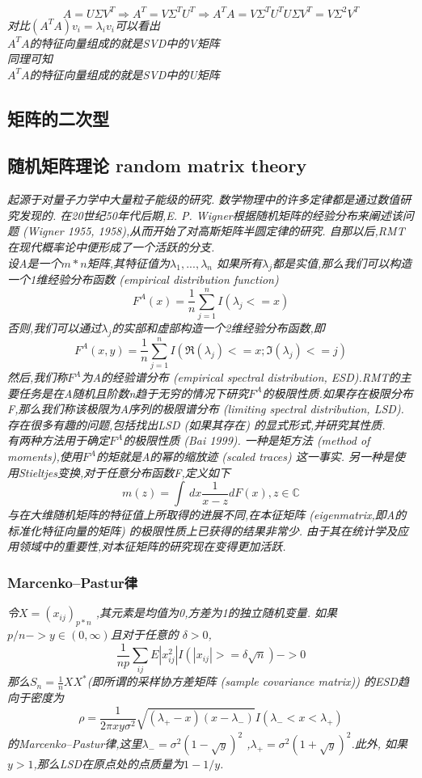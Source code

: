 \documentclass{scrartcl}
\numberwithin{equation}{section}   %
\begin{document}
\begin{equation}
    A = U \Sigma V^T \Rightarrow  A^T = V \Sigma ^T U^T \Rightarrow A^T A =  V \Sigma ^T U^TU \Sigma V^T = V \Sigma^2 V^T
\end{equation}
\textsl{对比$(A^T A )v_i= \lambda_i v_i $可以看出\\$A^T A $的特征向量组成的就是SVD中的V矩阵\\ 同理可知\\
    $A^T A $的特征向量组成的就是SVD中的U矩阵}





\subsection{矩阵的二次型}
\newpage


\subsection{随机矩阵理论 random matrix theory}
\textsl{起源于对量子力学中大量粒子能级的研究. 数学物理中的许多定律都是通过数值研究发现的. 在20世纪50年代后期,E. P. Wigner根据随机矩阵的经验分布来阐述该问题 (Wigner 1955, 1958),从而开始了对高斯矩阵半圆定律的研究. 自那以后,RMT在现代概率论中便形成了一个活跃的分支.\\
    设A是一个$m*n$矩阵,其特征值为$\lambda_1,...,\lambda_n$ 如果所有$\lambda_j$都是实值,那么我们可以构造一个1维经验分布函数 (empirical distribution function) $$F^A(x) =\frac{1}{n}\sum_{j=1}^nI(\lambda_j <= x)$$否则,我们可以通过$\lambda_j$的实部和虚部构造一个2维经验分布函数,即$$F^A(x, y) = \frac{1}{n}\sum_{j=1}^nI(\mathfrak{R} (\lambda_j) <= x; \mathfrak{I} (\lambda_j) <= j) $$然后,我们称$F^A$为A的经验谱分布 (empirical spectral distribution, ESD).RMT的主要任务是在A随机且阶数n趋于无穷的情况下研究$F^A$的极限性质.如果存在极限分布F,那么我们称该极限为A序列的极限谱分布 (limiting spectral distribution, LSD). 存在很多有趣的问题,包括找出LSD (如果其存在) 的显式形式,并研究其性质.\\
    有两种方法用于确定$F^A$的极限性质 (Bai 1999). 一种是矩方法 (method of moments),使用$F^A$的矩就是A的幂的缩放迹 (scaled traces) 这一事实. 另一种是使用Stieltjes变换,对于任意分布函数F,定义如下$$m(z)  = \int \,dx  \frac{1}{x-z} dF(x), z \in \mathbb{C} $$与在大维随机矩阵的特征值上所取得的进展不同,在本征矩阵 (eigenmatrix,即A的标准化特征向量的矩阵) 的极限性质上已获得的结果非常少. 由于其在统计学及应用领域中的重要性,对本征矩阵的研究现在变得更加活跃.
}
\subsubsection{Marcenko–Pastur律}
\textsl{令$X= (x_{ij})_{p*n}$ ,其元素是均值为0,方差为1的独立随机变量. 如果$p/n -> y \in (0, \infty)$且对于任意的 $\delta>0$,$$\frac{1}{np}\sum_{ij}E|x_{ij}^2|I(|x_{ij}|>=\delta\sqrt{n}) -> 0 $$那么$S_n=\frac{1}{n}XX^*$(即所谓的采样协方差矩阵 (sample covariance matrix)) 的ESD趋向于密度为$$ \rho = \frac{1}{2\pi xy \sigma^2}\sqrt{(\lambda_+-x)(x-\lambda_-)} I(\lambda_-<x<\lambda_+)$$的Marcenko–Pastur律,这里$\lambda_-= \sigma^2 (1-\sqrt{y})^2$ ,$\lambda_+= \sigma^2 (1+\sqrt{y})^2$.此外, 如果$y>1$,那么LSD在原点处的点质量为$1-1/y$.}
\end{document}
